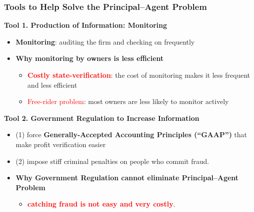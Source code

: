 \documentclass[aspectratio=169]{beamer}
\begin{document}
\begin{frame}
\frametitle{Tools to Help Solve the Principal–Agent Problem}

\textbf{Tool 1. Production of Information: Monitoring} 
\begin{itemize}
    \item \textbf{Monitoring}: auditing the firm and checking on frequently
    \medskip
    \item \textbf{Why monitoring by owners is less efficient}
    \begin{itemize}
        \item \textbf{\textcolor{red}{Costly state-verification}}: the cost of monitoring makes it less frequent and less efficient
        \smallskip 
        \item \textcolor{red}{Free-rider problem}: most owners are less likely to monitor actively 
    \end{itemize}
\end{itemize} \pause 

\medskip 

\textbf{Tool 2. Government Regulation to Increase Information } 
\begin{itemize} 
    \item (1) force \textbf{Generally-Accepted Accounting Principles (``GAAP'')} that make profit verification easier
    \item (2) impose stiff criminal penalties on people who commit fraud.
    \medskip
    \item \textbf{Why Government Regulation cannot eliminate Principal–Agent Problem}
    \begin{itemize}
        \item \textbf{\textcolor{red}{catching fraud is not easy and very costly}}.
    \end{itemize}
\end{itemize}


\end{frame}
\end{document}
